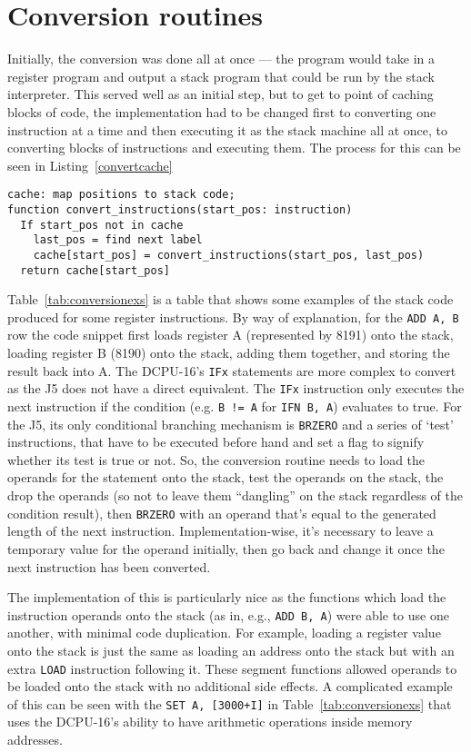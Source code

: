 \section{Conversion routines}
Initially, the conversion was done all at once --- the program would take in a
register program and output a stack program that could be run by the stack
interpreter. This served well as an initial step, but to get to point of caching
blocks of code, the implementation had to be changed first to converting one
instruction at a time and then executing it as the stack machine all at once, to
converting blocks of instructions and executing them. The process for this can
be seen in Listing~\ref{convertcache}

\begin{lstlisting}[label=convertcache,caption={Converted instruction
caching},float]
cache: map positions to stack code;
function convert_instructions(start_pos: instruction)
  If start_pos not in cache
    last_pos = find next label
    cache[start_pos] = convert_instructions(start_pos, last_pos)
  return cache[start_pos]
\end{lstlisting}

Table~\ref{tab:conversionexs} is a table that shows some examples of the stack
code produced for some register instructions.  By way of explanation, for the
\lstinline{ADD A, B} row the code snippet first loads register A (represented
by 8191) onto the stack, loading register B (8190) onto the stack, adding them
together, and storing the result back into A. The DCPU-16's \lstinline{IFx}
statements are more complex to convert as the J5 does not have a direct
equivalent. The \lstinline{IFx} instruction only executes the next instruction
if the condition (e.g. \lstinline{B != A} for \lstinline{IFN B, A}) evaluates to
true. For the J5, its only conditional branching mechanism is \lstinline{BRZERO}
and a series of `test' instructions, that have to be executed before hand and
set a flag to signify whether its test is true or not. So, the conversion
routine needs to load the operands for the statement onto the stack, test the
operands on the stack, the drop the operands (so not to leave them ``dangling''
on the stack regardless of the condition result), then \lstinline{BRZERO} with
an operand that's equal to the generated length of the next instruction.
Implementation-wise, it's necessary to leave a temporary value for the operand
initially, then go back and change it once the next instruction has been
converted.

The implementation of this is particularly nice as the functions which load the
instruction operands onto the stack (as in, e.g., \lstinline{ADD B, A}) were
able to use one another, with minimal code duplication. For example, loading a
register value onto the stack is just the same as loading an address onto the
stack but with an extra \lstinline{LOAD} instruction following it. These segment
functions allowed operands to be loaded onto the stack with no additional
side effects. A complicated example of this can be seen with the
\lstinline{SET A, [3000+I]} in Table~\ref{tab:conversionexs} that uses the
DCPU-16's ability to have arithmetic operations inside memory addresses.

